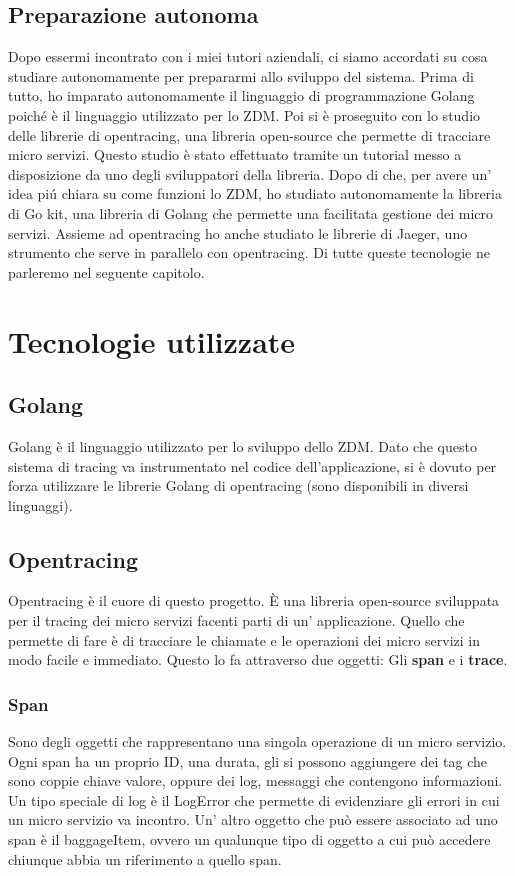 \documentclass[a4paper,12pt,titlepage,italian,openany]{report}
\begin{document}
\section{Preparazione autonoma}
Dopo essermi incontrato con i miei tutori aziendali, ci siamo accordati su cosa studiare autonomamente per prepararmi allo sviluppo del sistema.
Prima di tutto, ho imparato autonomamente il linguaggio di programmazione Golang poiché è il linguaggio utilizzato per lo ZDM\cite{zdm:1}.
Poi si è proseguito con lo studio delle librerie di opentracing, una libreria open-source che permette di tracciare micro servizi.
Questo studio è stato effettuato tramite un tutorial\cite{opentracing:2} messo a disposizione da uno degli sviluppatori della libreria. Dopo di che, per avere un' idea piú chiara su come funzioni lo ZDM,
ho studiato autonomamente la libreria di Go kit\cite{go:2}, una libreria di Golang che permette una facilitata gestione dei micro servizi.
Assieme ad opentracing ho anche studiato le librerie di Jaeger\cite{jaeger:1}, uno strumento che serve in parallelo con opentracing.
Di tutte queste tecnologie ne parleremo nel seguente capitolo.
\chapter{Tecnologie utilizzate}
\section{Golang}
Golang\cite{go:1} è il linguaggio utilizzato per lo sviluppo dello ZDM. Dato che questo sistema di tracing va instrumentato nel codice dell'applicazione, si è dovuto per forza utilizzare le librerie
Golang di opentracing (sono disponibili in diversi linguaggi).
\section{Opentracing}
Opentracing\cite{opentracing:1} è il cuore di questo progetto. È una libreria open-source sviluppata per il tracing dei micro servizi facenti parti di un' applicazione.
Quello che permette di fare è di tracciare le chiamate e le operazioni dei micro servizi in modo facile e immediato.
Questo lo fa attraverso due oggetti: Gli \textbf{span} e i \textbf{trace}.\\
\subsection{Span}
Sono degli oggetti che rappresentano una singola operazione di un micro servizio. Ogni span ha un proprio ID, una durata, 
gli si possono aggiungere dei tag che sono coppie chiave valore, oppure dei log, messaggi che contengono informazioni. Un tipo speciale di log è il LogError che permette
di evidenziare gli errori in cui un micro servizio va incontro. Un' altro oggetto che può essere associato ad uno span è il baggageItem, ovvero un qualunque tipo di oggetto a cui può accedere chiunque abbia un riferimento a quello span.
\end{document}
